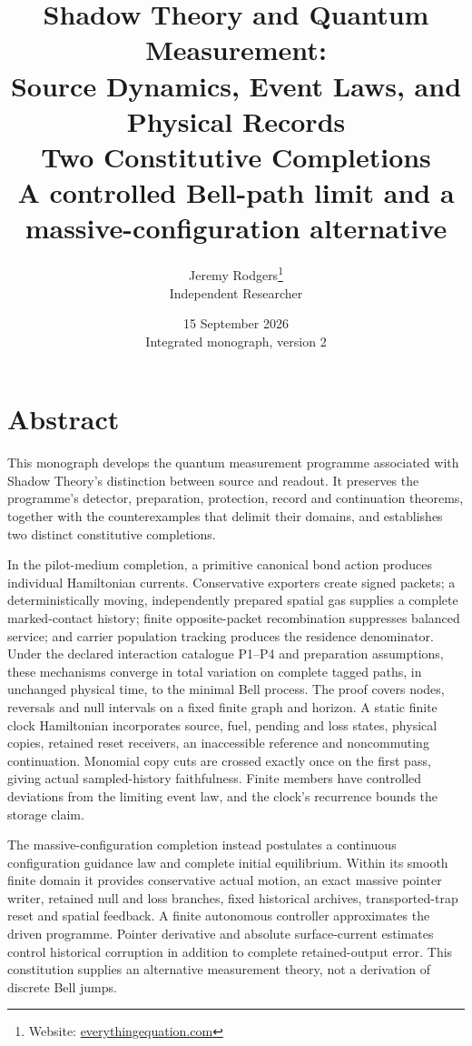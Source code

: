 \documentclass[11pt,oneside,openany]{book}
\title{%
  \bfseries Shadow Theory and Quantum Measurement:\\
  Source Dynamics, Event Laws, and Physical Records\\[6mm]
  {\large Two Constitutive Completions}\\[2mm]
  {\normalsize A controlled Bell-path limit and a
  massive-configuration alternative}
}
\author{%
  Jeremy Rodgers\thanks{Website:
  \href{https://everythingequation.com}{everythingequation.com}}\\
  \small Independent Researcher
}
\date{%
  15 September 2026\\[2mm]
  \small Integrated monograph, version 2
}
\theoremstyle{definition}
\theoremstyle{remark}\newtheorem{remark}[theorem]{Remark}
\begin{document}
\frontmatter
\maketitle

\chapter*{Abstract}
This monograph develops the quantum measurement programme associated with
Shadow Theory's distinction between source and readout. It preserves the
programme's detector, preparation, protection, record and continuation
theorems, together with the counterexamples that delimit their domains,
and establishes two distinct constitutive completions.

In the pilot-medium completion, a primitive canonical bond action produces
individual Hamiltonian currents. Conservative exporters create signed
packets; a deterministically moving, independently prepared spatial gas
supplies a complete marked-contact history; finite opposite-packet
recombination suppresses balanced service; and carrier population tracking
produces the residence denominator. Under the declared interaction
catalogue P1--P4 and preparation assumptions, these mechanisms converge in
total variation on complete tagged paths, in unchanged physical time, to
the minimal Bell process. The proof covers nodes, reversals and null
intervals on a fixed finite graph and horizon. A static finite clock
Hamiltonian incorporates source, fuel, pending and loss states, physical
copies, retained reset receivers, an inaccessible reference and
noncommuting continuation. Monomial copy cuts are crossed exactly once on
the first pass, giving actual sampled-history faithfulness. Finite members
have controlled deviations from the limiting event law, and the clock's
recurrence bounds the storage claim.

The massive-configuration completion instead postulates a continuous
configuration guidance law and complete initial equilibrium. Within its
smooth finite domain it provides conservative actual motion, an exact
massive pointer writer, retained null and loss branches, fixed historical
archives, transported-trap reset and spatial feedback. A finite autonomous
controller approximates the driven programme. Pointer derivative and
absolute surface-current estimates control historical corruption in
addition to complete retained-output error. This constitution supplies an
alternative measurement theory, not a derivation of discrete Bell jumps.
\end{document}
